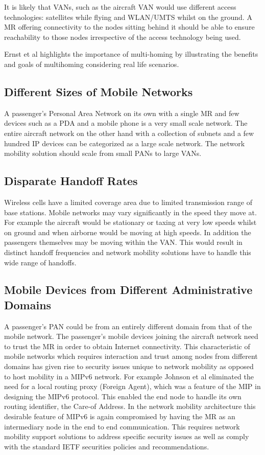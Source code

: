 It is likely that VANs, such as the aircraft VAN would use different access
technologies: satellites while flying and WLAN/UMTS whilst on the ground. A MR
offering connectivity to the nodes sitting behind it should be able to ensure
reachability to those nodes irrespective of the access technology being used.

Ernst et al \cite{8} highlights the importance of multi-homing by illustrating
the benefits and goals of multihoming considering real life scenarios.

\subsection{Different Sizes of Mobile Networks}

A passenger's Personal Area Network on its own with a single MR and few
devices such as a PDA and a mobile phone is a very small scale network. The
entire aircraft network on the other hand with a collection of subnets and a
few hundred IP devices can be categorized as a large scale network. The
network mobility solution should scale from small PANs to large VANs.

\subsection{Disparate Handoff Rates}

Wireless cells have a limited coverage area due to limited transmission range
of base stations. Mobile networks may vary significantly in the speed they
move at. For example the aircraft would be stationary or taxing at very low
speeds whilst on ground and when airborne would be moving at high speeds. In
addition the passengers themselves may be moving within the VAN. This would
result in distinct handoff frequencies and network mobility solutions have to
handle this wide range of handoffs.

\subsection{Mobile Devices from Different Administrative Domains}

A passenger's PAN could be from an entirely different domain from that of the
mobile network. The passenger's mobile devices joining the aircraft network
need to trust the MR in order to obtain Internet connectivity. This
characteristic of mobile networks which requires interaction and trust among
nodes from different domains has given rise to security issues unique to
network mobility as opposed to host mobility in a MIPv6 network. For example
Johnson et al \cite{9} eliminated the need for a local routing proxy (Foreign
Agent), which was a feature of the MIP in designing the MIPv6 protocol. This
enabled the end node to handle its own routing identifier, the Care-of
Address. In the network mobility architecture this desirable feature of MIPv6
is again compromised by having the MR as an intermediary node in the end to
end communication. This requires network mobility support solutions to address
specific security issues as well as comply with the standard IETF securities
policies and recommendations.

